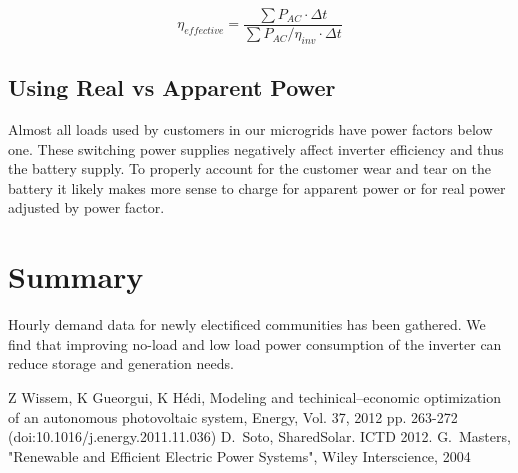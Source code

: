 \documentclass[conference]{IEEEtran}
\begin{document}
$$ \eta_{effective} = \frac{\sum P_{AC} \cdot \Delta t}
                          {\sum P_{AC} /\eta_{inv} \cdot \Delta t} $$

\subsection{Using Real vs Apparent Power}
Almost all loads used by customers in our microgrids have power
factors below one.
These switching power supplies negatively affect inverter efficiency
and thus the battery supply.
To properly account for the customer wear and tear on the battery
it likely makes more sense to charge for apparent power or for
real power adjusted by power factor.

\section{Summary}
Hourly demand data for newly electificed communities has been gathered.
We find that improving no-load and low load power consumption of the
inverter can reduce storage and generation needs.

\begin{thebibliography}{1}
Z Wissem, K Gueorgui, K H\'edi,
Modeling and techinical--economic optimization of an autonomous
photovoltaic system,
Energy, Vol. 37, 2012 pp. 263-272
(doi:10.1016/j.energy.2011.11.036)
D.~Soto, SharedSolar. ICTD 2012.
G.~Masters,
"Renewable and Efficient Electric Power Systems",
Wiley Interscience,
2004
\end{thebibliography}
\end{document}
